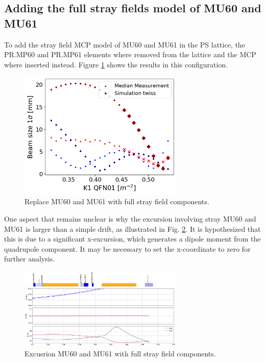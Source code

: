 \subsection{Adding the full stray fields model of MU60 and MU61}

To add the stray field MCP model of MU60 and MU61 in the PS lattice, the PR.MP60 and PR.MP61 elements where removed from the lattice and the MCP where inserted instead. Figure \ref{fig:mcp_mu60_mu61} shows the results in this configuration.

\begin{figure}[H]
\centering
\includegraphics[width=0.7\textwidth]{02_Simulation/images/mcp_mu60_mu61.png}
\caption{Replace MU60 and MU61 with full stray field components.}
\label{fig:mcp_mu60_mu61}
\end{figure}

One aspect that remains unclear is why the excursion involving stray MU60 and MU61 is larger than a simple drift, as illustrated in Fig. \ref{fig:excursion_m60_mu61_mcp}. It is hypothesized that this is due to a significant x-excursion, which generates a dipole moment from the quadrupole component. It may be necessary to set the x-coordinate to zero for further analysis.

\begin{figure}[H]
\centering
\includegraphics[width=0.7\textwidth]{02_Simulation/images/excursion_mu60_mu61_mcp.png}
\caption{Excusrion MU60 and MU61 with full stray field components.}
\label{fig:excursion_m60_mu61_mcp}
\end{figure}

